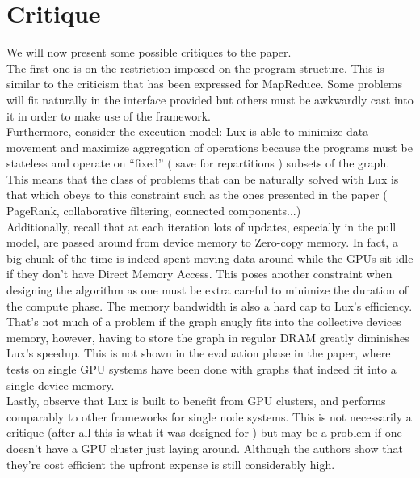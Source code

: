 \documentclass[]{article}
\begin{document}
\section{Critique}
We will now present some possible critiques to the paper.\\
The first one is on the restriction imposed on the program structure. This is similar to the criticism that has been expressed for MapReduce. Some problems will fit naturally in the interface provided but others must be awkwardly cast into it in order to make use of the framework.\\
Furthermore, consider the execution model: Lux is able to minimize data movement and maximize aggregation of operations because the programs must be stateless and operate on ``fixed'' ( save for repartitions ) subsets of the graph. This means that the class of problems that can be naturally solved with Lux is that which obeys to this constraint such as the ones presented in the paper ( PageRank, collaborative filtering, connected components...)\\
Additionally, recall that at each iteration lots of updates, especially in the pull model, are passed around from device memory to Zero-copy memory. In fact, a big chunk of the time is indeed spent moving data around while the GPUs sit idle if they don't have Direct Memory Access. This poses another constraint when designing the algorithm as one must be extra careful to minimize the duration of the compute phase. The memory bandwidth is also a hard cap to Lux's efficiency. That's not much of a problem if the graph snugly fits into the collective devices memory, however, having to store the graph in regular DRAM greatly diminishes Lux's speedup. This is not shown in the evaluation phase in the paper, where tests on single GPU systems have been done with graphs that indeed fit into a single device memory.\\
Lastly, observe that Lux is built to benefit from GPU clusters, and performs comparably to other frameworks for single node systems. This is not necessarily a critique (after all this is what it was designed for ) but may be a problem if one doesn't have a GPU cluster just laying around. Although the authors show that they're cost efficient the upfront expense is still considerably high.
\end{document}
